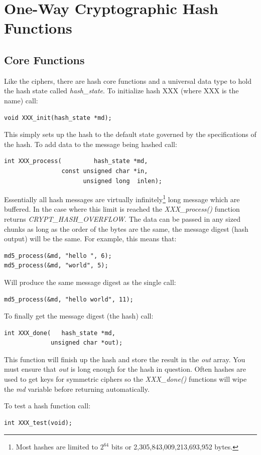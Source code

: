 \documentclass[synpaper]{book}
\newcommand{\mysection}[1]    %
	{                   %
	\section{#1}
   \markboth{\textsf{www.libtom.net}}{\thesection ~ {#1}}
	}
\begin{document}
\chapter{One-Way Cryptographic Hash Functions}
\mysection{Core Functions}
Like the ciphers, there are hash core functions and a universal data type to hold the hash state called \textit{hash\_state}.  To initialize hash
XXX (where XXX is the name) call:
\begin{verbatim}
void XXX_init(hash_state *md);
\end{verbatim}

This simply sets up the hash to the default state governed by the specifications of the hash.  To add data to the message being hashed call:
\begin{verbatim}
int XXX_process(         hash_state *md,
                const unsigned char *in,
                      unsigned long  inlen);
\end{verbatim}
Essentially all hash messages are virtually infinitely\footnote{Most hashes are limited to $2^{64}$ bits or 2,305,843,009,213,693,952 bytes.} long message which
are buffered.  In the case where this limit is reached the \textit{XXX\_process()} function returns \textit{CRYPT\_HASH\_OVERFLOW}.
The data can be passed in any sized chunks as long as the order of the bytes are the same, the message digest (hash output) will be the same.  For example, this means that:
\begin{verbatim}
md5_process(&md, "hello ", 6);
md5_process(&md, "world", 5);
\end{verbatim}
Will produce the same message digest as the single call:
\begin{verbatim}
md5_process(&md, "hello world", 11);
\end{verbatim}

To finally get the message digest (the hash) call:
\begin{verbatim}
int XXX_done(   hash_state *md,
             unsigned char *out);
\end{verbatim}

This function will finish up the hash and store the result in the \textit{out} array.  You must ensure that \textit{out} is long
enough for the hash in question.  Often hashes are used to get keys for symmetric ciphers so the \textit{XXX\_done()} functions
will wipe the \textit{md} variable before returning automatically.

To test a hash function call:
\begin{verbatim}
int XXX_test(void);
\end{verbatim}
\end{document}
